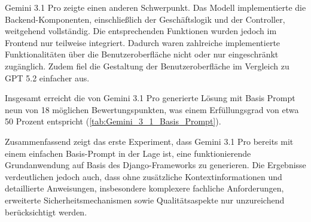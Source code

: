 Gemini 3.1 Pro zeigte einen anderen Schwerpunkt. Das Modell implementierte die Backend-Komponenten, einschließlich der Geschäftslogik und der Controller, weitgehend vollständig. Die entsprechenden Funktionen wurden jedoch im Frontend nur teilweise integriert. Dadurch waren zahlreiche implementierte Funktionalitäten über die Benutzeroberfläche nicht oder nur eingeschränkt zugänglich. Zudem fiel die Gestaltung der Benutzeroberfläche im Vergleich zu GPT 5.2 einfacher aus.

Insgesamt erreicht die von Gemini 3.1 Pro generierte Lösung mit Basis Prompt neun von 18 möglichen Bewertungspunkten, was einem Erfüllungsgrad von etwa 50 Prozent entspricht (\ref{tab:Gemini_3_1_Basis_Prompt}).

Zusammenfassend zeigt das erste Experiment, dass Gemini 3.1 Pro bereits mit einem einfachen Basis-Prompt in der Lage ist, eine funktionierende Grundanwendung auf Basis des Django-Frameworks zu generieren. Die Ergebnisse verdeutlichen jedoch auch, dass ohne zusätzliche Kontextinformationen und detaillierte Anweisungen, insbesondere komplexere fachliche Anforderungen, erweiterte Sicherheitsmechanismen sowie Qualitätsaspekte nur unzureichend berücksichtigt werden.

